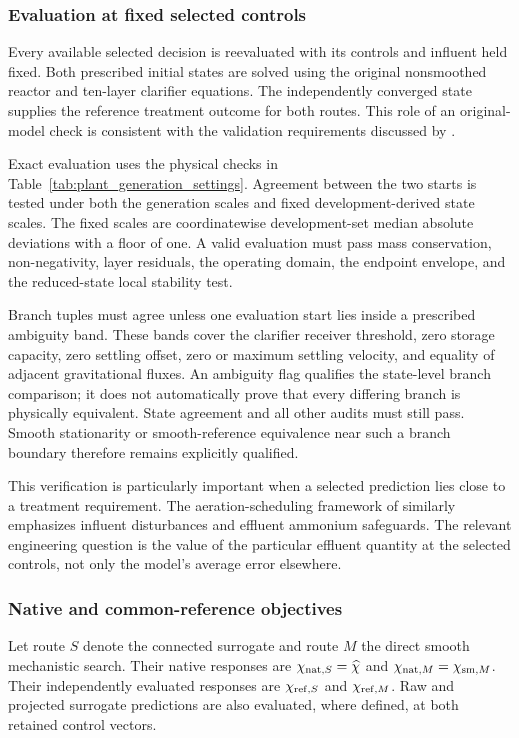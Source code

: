 \subsubsection{Evaluation at fixed selected controls}

Every available selected decision is reevaluated with its controls and influent held fixed. Both prescribed initial states are solved using the original nonsmoothed reactor and ten-layer clarifier equations. The independently converged state supplies the reference treatment outcome for both routes. This role of an original-model check is consistent with the validation requirements discussed by \citet{BhosekarIerapetritou2018}.

Exact evaluation uses the physical checks in Table~\ref{tab:plant_generation_settings}. Agreement between the two starts is tested under both the generation scales and fixed development-derived state scales. The fixed scales are coordinatewise development-set median absolute deviations with a floor of one. A valid evaluation must pass mass conservation, non-negativity, layer residuals, the operating domain, the endpoint envelope, and the reduced-state local stability test.

Branch tuples must agree unless one evaluation start lies inside a prescribed ambiguity band. These bands cover the clarifier receiver threshold, zero storage capacity, zero settling offset, zero or maximum settling velocity, and equality of adjacent gravitational fluxes. An ambiguity flag qualifies the state-level branch comparison; it does not automatically prove that every differing branch is physically equivalent. State agreement and all other audits must still pass. Smooth stationarity or smooth-reference equivalence near such a branch boundary therefore remains explicitly qualified.

This verification is particularly important when a selected prediction lies close to a treatment requirement. The aeration-scheduling framework of \citet{Ren2026} similarly emphasizes influent disturbances and effluent ammonium safeguards. The relevant engineering question is the value of the particular effluent quantity at the selected controls, not only the model's average error elsewhere.

\subsubsection{Native and common-reference objectives}

Let route $S$ denote the connected surrogate and route $M$ the direct smooth mechanistic search. Their native responses are $\chi_{{\rm nat},S}=\widehat\chi$ and $\chi_{{\rm nat},M}=\chi_{{\rm sm},M}$. Their independently evaluated responses are $\chi_{{\rm ref},S}$ and $\chi_{{\rm ref},M}$. Raw and projected surrogate predictions are also evaluated, where defined, at both retained control vectors.

